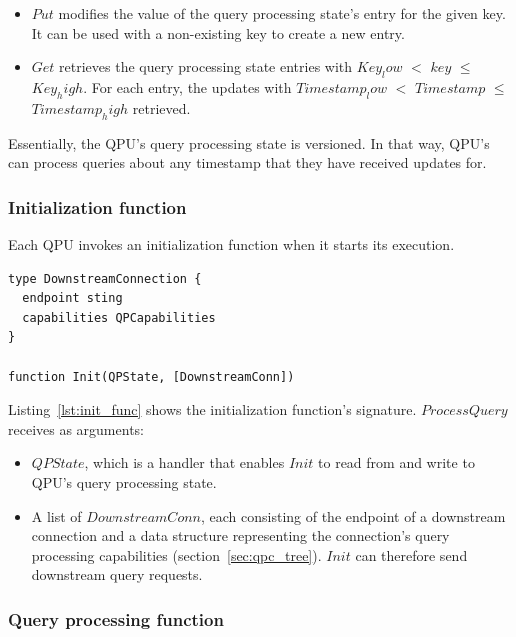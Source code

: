 \begin{itemize}
  \item $Put$ modifies the value of the query processing state's entry for the given key.
  It can be used with a non-existing key to create a new entry.

  \item $Get$ retrieves the query processing state entries with $Key_low$ $<$ $key$ $\leq$ $Key_high$.
  For each entry, the updates with $Timestamp_low$ $<$ $Timestamp$ $\leq$ $Timestamp_high$ retrieved.
\end{itemize}

Essentially, the QPU's query processing state is versioned.
In that way, QPU's can process queries about any timestamp that they have received updates for.


\subsubsection{Initialization function}
\label{sec:initialization_func}

Each QPU invokes an initialization function when it starts its execution.

\begin{lstlisting}[caption={Initialization function signature},captionpos=b,label={lst:init_func}]
type DownstreamConnection {
  endpoint sting
  capabilities QPCapabilities
}

function Init(QPState, [DownstreamConn])
\end{lstlisting}

\noindent
Listing~\ref{lst:init_func} shows the initialization function's signature.
$ProcessQuery$ receives as arguments:
\begin{itemize}
  \item $QPState$, which is a handler that enables $Init$ to read from and write to QPU's query processing state.

  \item A list of $DownstreamConn$, each consisting of the endpoint of a downstream connection and a data structure
  representing the connection's query processing capabilities (section~\ref{sec:qpc_tree}).
  $Init$ can therefore send downstream query requests.
\end{itemize}


\subsubsection{Query processing function}
\label{sec:query_processing_func}

